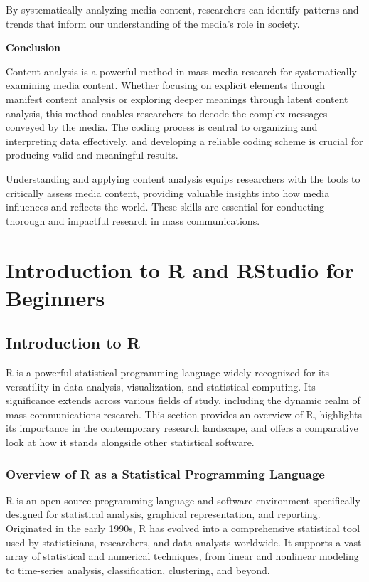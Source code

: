 \documentclass[
]{book}
\begin{document}
By systematically analyzing media content, researchers can identify patterns and trends that inform our understanding of the media's role in society.

\textbf{Conclusion}

Content analysis is a powerful method in mass media research for systematically examining media content. Whether focusing on explicit elements through manifest content analysis or exploring deeper meanings through latent content analysis, this method enables researchers to decode the complex messages conveyed by the media. The coding process is central to organizing and interpreting data effectively, and developing a reliable coding scheme is crucial for producing valid and meaningful results.

Understanding and applying content analysis equips researchers with the tools to critically assess media content, providing valuable insights into how media influences and reflects the world. These skills are essential for conducting thorough and impactful research in mass communications.

\chapter{Introduction to R and RStudio for Beginners}\label{introduction-to-r-and-rstudio-for-beginners}

\section{Introduction to R}\label{introduction-to-r}

R is a powerful statistical programming language widely recognized for its versatility in data analysis, visualization, and statistical computing. Its significance extends across various fields of study, including the dynamic realm of mass communications research. This section provides an overview of R, highlights its importance in the contemporary research landscape, and offers a comparative look at how it stands alongside other statistical software.

\subsection*{Overview of R as a Statistical Programming Language}\label{overview-of-r-as-a-statistical-programming-language}

R is an open-source programming language and software environment specifically designed for statistical analysis, graphical representation, and reporting. Originated in the early 1990s, R has evolved into a comprehensive statistical tool used by statisticians, researchers, and data analysts worldwide. It supports a vast array of statistical and numerical techniques, from linear and nonlinear modeling to time-series analysis, classification, clustering, and beyond.
\end{document}
